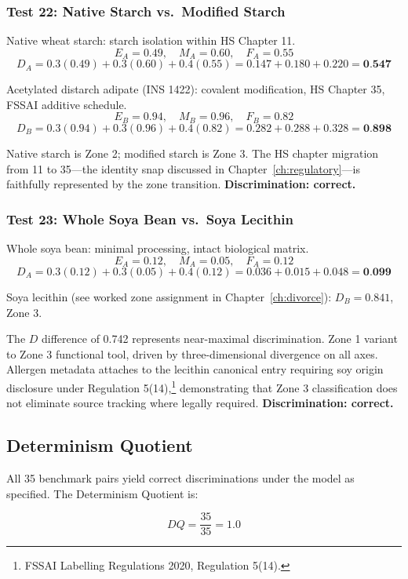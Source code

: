 \documentclass[12pt,a3paper]{article}
\begin{document}
\subsubsection{Test 22: Native Starch vs.\ Modified Starch}

Native wheat starch: starch isolation within HS Chapter 11.
$$E_A = 0.49,\quad M_A = 0.60,\quad F_A = 0.55$$
$$D_A = 0.3(0.49) + 0.3(0.60) + 0.4(0.55) = 0.147 + 0.180 + 0.220 = \textbf{0.547}$$

Acetylated distarch adipate (INS 1422): covalent modification, HS Chapter 35, FSSAI additive schedule.
$$E_B = 0.94,\quad M_B = 0.96,\quad F_B = 0.82$$
$$D_B = 0.3(0.94) + 0.3(0.96) + 0.4(0.82) = 0.282 + 0.288 + 0.328 = \textbf{0.898}$$

Native starch is Zone 2; modified starch is Zone 3. The HS chapter migration from 11 to 35---the identity snap discussed in Chapter~\ref{ch:regulatory}---is faithfully represented by the zone transition. \textbf{Discrimination: correct.}

\subsubsection{Test 23: Whole Soya Bean vs.\ Soya Lecithin}

Whole soya bean: minimal processing, intact biological matrix.
$$E_A = 0.12,\quad M_A = 0.05,\quad F_A = 0.12$$
$$D_A = 0.3(0.12) + 0.3(0.05) + 0.4(0.12) = 0.036 + 0.015 + 0.048 = \textbf{0.099}$$

Soya lecithin (see worked zone assignment in Chapter~\ref{ch:divorce}): $D_B = 0.841$, Zone 3.

The $D$ difference of 0.742 represents near-maximal discrimination. Zone 1 variant to Zone 3 functional tool, driven by three-dimensional divergence on all axes. Allergen metadata attaches to the lecithin canonical entry requiring soy origin disclosure under Regulation 5(14),\footnote{FSSAI Labelling Regulations 2020, Regulation 5(14).} demonstrating that Zone 3 classification does not eliminate source tracking where legally required. \textbf{Discrimination: correct.}

\subsection{Determinism Quotient}

All 35 benchmark pairs yield correct discriminations under the model as specified. The Determinism Quotient is:

$$DQ = \frac{35}{35} = \mathbf{1.0}$$
\end{document}
